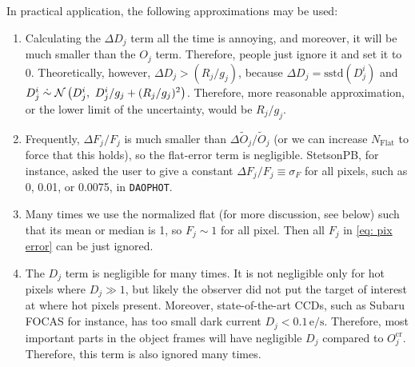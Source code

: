 In practical application, the following approximations may be used:
\begin{enumerate}
\item Calculating the $ \Delta D_j $ term all the time is annoying, and moreover, it will be much smaller than the $ O_j $ term. Therefore, people just ignore it and set it to 0. Theoretically, however, $ \Delta D_j > (R_j/g_j) $, because $\Delta D_j = \mathrm{sstd} (D_j^{i}) $ and $ D_j^{i} \mathrel{\dot{\sim}} \mathcal{N} \left (D_j^{i},~ D_j^{i}/g_j + (R_j/g_j)^2 \right ) $. Therefore, more reasonable approximation, or the lower limit of the uncertainty, would be $ R_j/g_j $. 
\item Frequently, $ \Delta F_j/F_j $ is much smaller than $ \Delta \tilde{O}_j/\tilde{O}_j $ (or we can increase $ N_\mathrm{Flat} $ to force that this holds), so the flat-error term is negligible. StetsonPB, for instance, asked the user to give a constant $ \Delta F_j/F_j \equiv \sigma_F $ for all pixels, such as 0, 0.01, or 0.0075, in \texttt{DAOPHOT}.
\item Many times we use the normalized flat (for more discussion, see below) such that its mean or median is 1, so $ F_j \sim 1 $ for all pixel. Then all $ F_j $ in \cref{eq: pix error} can be just ignored.
\item The $ D_j $ term is negligible for many times. It is not negligible only for hot pixels where $ D_j \gg 1 $, but likely the observer did not put the target of interest at where hot pixels present. Moreover, state-of-the-art CCDs, such as Subaru FOCAS for instance, has too small dark current $ D_j < 0.1 \,\mathrm{e/s} $. Therefore, most important parts in the object frames will have negligible $ D_j $ compared to $ O_j^\mathrm{cr} $. Therefore, this term is also ignored many times.
\end{enumerate}

